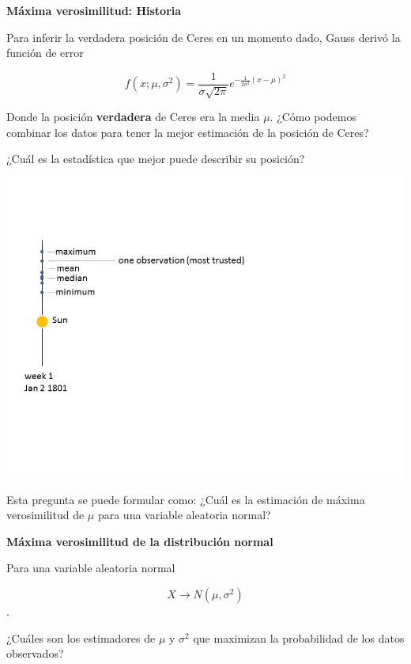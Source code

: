 \documentclass[
]{book}
\begin{document}
\textbf{Máxima verosimilitud: Historia}

Para inferir la verdadera posición de Ceres en un momento dado, Gauss derivó la función de error

\[f(x; \mu, \sigma^2)= \frac{1}{\sigma \sqrt{2 \pi}} e^{-\frac{1}{2\sigma^2} (x- \mu)^2}\]

Donde la posición \textbf{verdadera} de Ceres era la media \(\mu\). ¿Cómo podemos combinar los datos para tener la mejor estimación de la posición de Ceres?

¿Cuál es la estadística que mejor puede describir su posición?

\includegraphics{./figures/cerestime.JPG}

Esta pregunta se puede formular como: ¿Cuál es la estimación de máxima verosimilitud de \(\mu\) para una variable aleatoria normal?

\textbf{Máxima verosimilitud de la distribución normal}

Para una variable aleatoria normal

\[X \rightarrow N(\mu, \sigma^2)\].

¿Cuáles son los estimadores de \(\mu\) y \(\sigma^2\) que maximizan la probabilidad de los datos observados?
\end{document}
